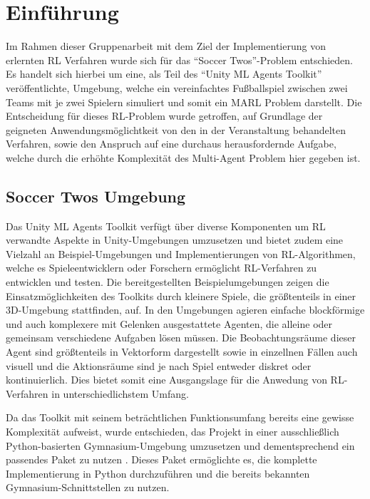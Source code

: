 \chapter{Einführung} \label{chapter:1}

Im Rahmen dieser Gruppenarbeit mit dem Ziel der Implementierung von erlernten \ac{RL} Verfahren wurde sich für das ``Soccer Twos''-Problem \cite[p. 15]{juliani2020} entschieden. Es handelt sich hierbei um eine, als Teil des ``Unity \ac{ML} Agents Toolkit'' \cite{juliani2020} veröffentlichte, Umgebung, welche ein vereinfachtes Fußballspiel zwischen zwei Teams mit je zwei Spielern simuliert und somit ein \ac{MARL} Problem darstellt.
Die Entscheidung für dieses \ac{RL}-Problem wurde getroffen, auf Grundlage der geigneten Anwendungsmöglichtkeit von den in der Veranstaltung behandelten Verfahren, sowie den Anspruch auf eine durchaus herausfordernde Aufgabe, welche durch die erhöhte Komplexität des Multi-Agent Problem hier gegeben ist. 

\section{Soccer Twos Umgebung}

Das Unity \ac{ML} Agents Toolkit verfügt über diverse Komponenten um \ac{RL} verwandte Aspekte in Unity-Umgebungen umzusetzen und bietet zudem eine Vielzahl an Beispiel-Umgebungen und Implementierungen von \ac{RL}-Algorithmen, welche es Spieleentwicklern oder Forschern ermöglicht \ac{RL}-Verfahren zu entwicklen und testen. 
Die bereitgestellten Beispielumgebungen zeigen die Einsatzmöglichkeiten des Toolkits durch kleinere Spiele, die größtenteils in einer 3D-Umgebung stattfinden, auf. In den Umgebungen agieren einfache blockförmige und auch komplexere mit Gelenken ausgestattete Agenten, die alleine oder gemeinsam verschiedene Aufgaben lösen müssen. Die Beobachtungsräume dieser Agent sind größtenteils in Vektorform dargestellt sowie in einzellnen Fällen auch visuell und die Aktionsräume sind je nach Spiel entweder diskret oder kontinuierlich. Dies bietet somit eine Ausgangslage für die Anwedung von \ac{RL}-Verfahren in unterschiedlichstem Umfang.

Da das Toolkit mit seinem beträchtlichen Funktionsumfang bereits eine gewisse Komplexität aufweist, wurde entschieden, das Projekt in einer ausschließlich Python-basierten Gymnasium-Umgebung umzusetzen und dementsprechend ein passendes Paket zu nutzen \cite{soccertwos}. Dieses Paket ermöglichte es, die komplette Implementierung in Python durchzuführen und die bereits bekannten Gymnasium-Schnittstellen zu nutzen.


